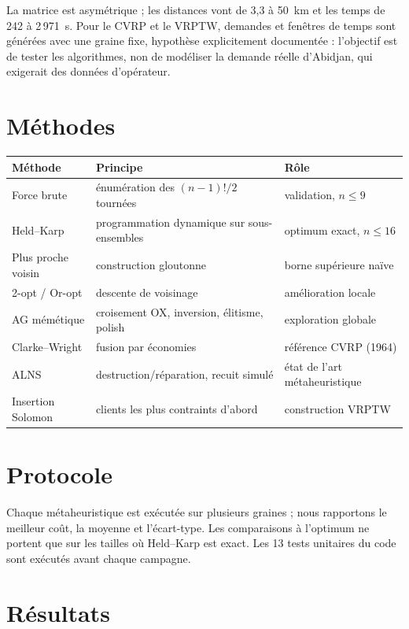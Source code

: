 \documentclass[11pt,a4paper]{article}
\begin{document}
La matrice est asymétrique ; les distances vont de 3,3 à 50~km et les temps de 242 à 2\,971~s. Pour le CVRP et le VRPTW, demandes et fenêtres de temps sont générées avec une graine fixe, hypothèse explicitement documentée : l'objectif est de tester les algorithmes, non de modéliser la demande réelle d'Abidjan, qui exigerait des données d'opérateur.

\section{Méthodes}

\begin{center}
\small
\begin{tabular}{@{}p{3.6cm}p{7.4cm}p{4.2cm}@{}}
\toprule
\textbf{Méthode} & \textbf{Principe} & \textbf{Rôle} \\
\midrule
Force brute & énumération des $(n-1)!/2$ tournées & validation, $n \le 9$ \\
Held--Karp & programmation dynamique sur sous-ensembles & optimum exact, $n \le 16$ \\
Plus proche voisin & construction gloutonne & borne supérieure naïve \\
2-opt / Or-opt & descente de voisinage & amélioration locale \\
AG mémétique & croisement OX, inversion, élitisme, polish & exploration globale \\
Clarke--Wright & fusion par économies & référence CVRP (1964) \\
ALNS & destruction/réparation, recuit simulé & état de l'art métaheuristique \\
Insertion Solomon & clients les plus contraints d'abord & construction VRPTW \\
\bottomrule
\end{tabular}
\end{center}

\section{Protocole}

Chaque métaheuristique est exécutée sur plusieurs graines ; nous rapportons le meilleur coût, la moyenne et l'écart-type. Les comparaisons à l'optimum ne portent que sur les tailles où Held--Karp est exact. Les 13 tests unitaires du code sont exécutés avant chaque campagne.

\section{Résultats}
\end{document}
